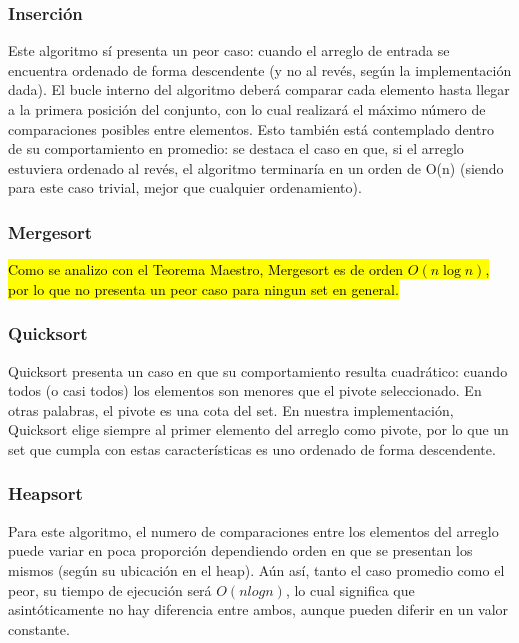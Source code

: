 \documentclass[article,a4paper]{article}
\begin{document}
\subsubsection{Inserción}

Este algoritmo sí presenta un peor caso: cuando el arreglo de entrada se encuentra ordenado de forma descendente (y no al revés, según la implementación dada). El bucle interno del algoritmo deberá comparar cada elemento hasta llegar a la primera posición del conjunto, con lo cual realizará el máximo número de comparaciones posibles entre elementos. Esto también está contemplado dentro de su comportamiento en promedio: se destaca el caso en que, si el arreglo estuviera ordenado al revés, el algoritmo terminaría en un orden de O(n) (siendo para este caso trivial, mejor que cualquier ordenamiento).

\subsubsection{Mergesort}

\hl{Como se analizo con el Teorema Maestro, Mergesort es de orden $O(n \log n)$, por lo que no presenta un peor caso para ningun set en general.}

\subsubsection{Quicksort}

Quicksort presenta un caso en que su comportamiento resulta cuadrático: cuando todos (o casi todos) los elementos son  menores que el pivote seleccionado. En otras palabras, el pivote es una cota del set. En nuestra implementación, Quicksort elige siempre al primer elemento del arreglo como pivote, por lo que un set que cumpla con estas características es uno ordenado de forma  descendente.

\subsubsection{Heapsort}

Para este algoritmo, el numero de comparaciones entre los elementos del arreglo puede variar en poca proporción dependiendo orden en que se presentan los mismos (según su ubicación en el heap). Aún así, tanto el caso promedio como el peor, su tiempo de ejecución será $O(n log n)$, lo cual significa que asintóticamente no hay diferencia entre ambos, aunque pueden diferir en un valor constante.
\end{document}
